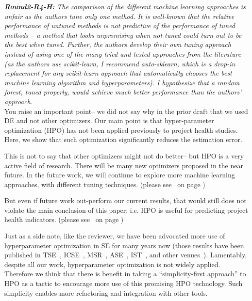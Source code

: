 \documentclass[smallextended]{svjour3}
\newcommand{\citeresp}[1]{%
{(please see }\fcolorbox{black}{black!15}{%
\bf\scriptsize R{#1}}~{{on page \pageref{resp:#1})}}}%
\newcommand{\review}[1]{{\textit{#1}}~\\}
\newcommand{\BLUE}{\color{blue}}
\newcommand{\BLACK}{\color{black}}
\begin{document}
\BLACK
\bigskip


\review{\textbf{Round2-R4-H:} The comparison of the different machine learning approaches is unfair as the authors tune only one method. It is well-known that the relative performance of untuned methods is not predictive of the performance of tuned methods -- a method that looks unpromising when not tuned could turn out to be the best when
tuned. Further, the authors develop their own tuning approach instead of using one of the many tried-and-tested approaches from the literature (as the authors use scikit-learn, I recommend auto-sklearn, which is a drop-in replacement for any scikit-learn approach that automatically chooses the best machine learning
algorithm and hyperparameters). I hypothesize that a random forest, tuned properly, would achieve much better performance than the authors' approach.
}




\BLUE
You raise an important point-- we did not say why in the prior
draft that we used DE and not other optimizers.
Our 
main point is that hyper-parameter  optimization (HPO) 
has not been applied previously to project health studies. Here, we show that such optimization significantly reduces the estimation error.

This is not to say that other optimizers might not do better-- but HPO is a  very active field of research. There will be many new optimizers proposed in the near future. In the future work, we will continue to explore 
more machine learning approaches, with different tuning techniques. \citeresp{4H1} 

But   even if  future work    out-perform our current results, that would still does not violate the main conclusion of this paper; i.e. HPO is useful for predicting project health indicators. \citeresp{4H2} 

Just as a side note,  
like the reviewer,
we have been advocated more use of hyperparameter optimization
in SE for many years now
(those results have been published in
TSE~\cite{nair2017flash,agrawal2019dodge},
ICSE~\cite{agrawal2018better},
MSR~\cite{nair2018data},
ASE~\cite{yedida2021lessons},
IST~\cite{fu2016tuning},
and other venues~\cite{tu2018one}).
Lamentably,   despite all our work, hyperparameter optimization 
is not widely applied. Therefore we think that there is benefit in taking a ``simplicity-first approach'' to HPO as a  tactic to  encourage more use of this promising HPO technology. Such simplicity  enables more refactoring and integration with other tools.
\end{document}
